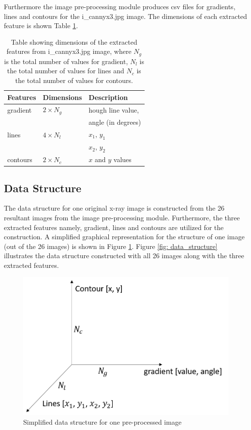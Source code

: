 \documentclass[11pt,twocolumn]{witseiepaper}
\begin{document}
	Furthermore the image pre-processing module produces csv files for gradients, lines and contours for the i\_cannyx3.jpg image. The dimensions of each extracted feature is shown Table \ref{feature_selection}.
	
	\begin{table}[!h]
		\centering
		\caption{Table showing dimensions of the extracted features from i\_cannyx3.jpg image, where $N_g$ is the total number of values for gradient, $N_l$ is the total number of values for lines and $N_c$ is the total number of values for contours.}
		\label{feature_selection}
		\begin{tabular}{|l|p{2cm}|l|}
			\hline
			Features & Dimensions & Description \\
			\hline \hline
			gradient & $2 \times N_g $ & hough line value, \\
			& & angle (in degrees)\\
			\hline
			lines    & $4 \times N_l $ & $x_{1}$, $y_{1}$ \\
			& & $x_{2}$, $y_{2}$ \\
			\hline
			contours & $2 \times N_c $  & $x$ and $y$ values \\
			\hline
		\end{tabular}
	\end{table}
	
	\subsection{Data Structure}
	The data structure for one original x-ray image is constructed from the 26 resultant images from the image pre-processing module. Furthermore, the three extracted features namely, gradient, lines and contours are utilized for the construction. A simplified graphical representation for the structure of one image (out of the 26 images) is shown in Figure \ref{fig: second_structure}. Figure \ref{fig: data_structure} illustrates the data structure constructed with all 26 images along with the three extracted features.
	\begin{figure}[!h]
		\centering
		\includegraphics[scale=0.23]{second_structure.png}
		\caption{Simplified data structure for one pre-processed image}
		\label{fig: second_structure}
	\end{figure}
\end{document}
